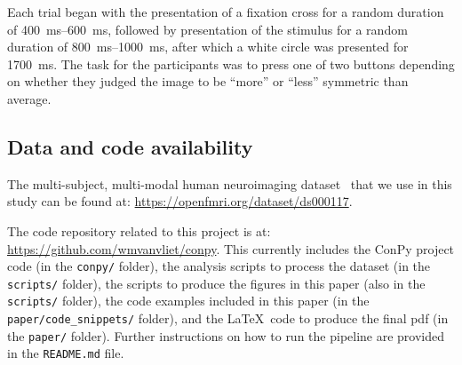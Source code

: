 \documentclass[utf8]{frontiersSCNS}
\renewcommand{\cite}[1]{~\citep{#1}}
\newcommand{\textcite}[1]{\citet{#1}}
\newcommand{\code}[1]{\lstinline{#1}}
\newcommand{\bm}[1]{\mathbf{#1}}
\newcommand{\mat}[1]{\bm{#1}}
\renewcommand{\vec}[1]{\bm{#1}}
\begin{document}
Each trial began with the presentation of a fixation cross for a random duration of \SIrange{400}{600}{\milli\second}, followed by presentation of the stimulus for a random duration of \SIrange{800}{1000}{\milli\second}, after which a white circle was presented for \SI{1700}{\milli\second}.
The task for the participants was to press one of two buttons depending on whether they judged the image to be ``more'' or ``less'' symmetric than average.

% 
% 
% 

\subsection{Data and code availability}\label{data}

The multi-subject, multi-modal human neuroimaging dataset\cite{Wakeman2015} that we use in this study can be found at: \url{https://openfmri.org/dataset/ds000117}.

The code repository related to this project is at: \url{https://github.com/wmvanvliet/conpy}.
This currently includes the ConPy project code (in the \code{conpy/} folder), the analysis scripts to process the \textcite{Wakeman2015} dataset (in the \code{scripts/} folder), the scripts to produce the figures in this paper (also in the \code{scripts/} folder), the code examples included in this paper (in the \code{paper/code_snippets/} folder), and the \LaTeX\ code to produce the final pdf (in the \code{paper/} folder).
Further instructions on how to run the pipeline are provided in the \code{README.md} file.
\end{document}
